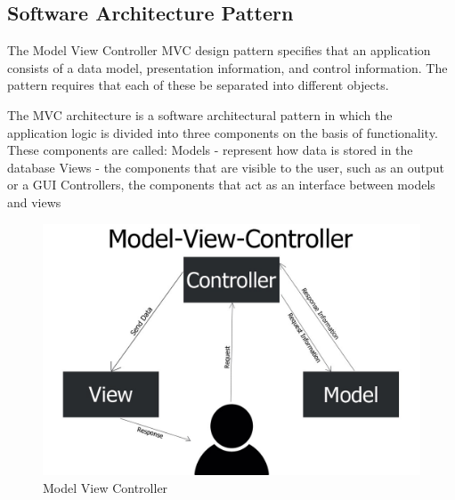 \subsection{Software Architecture Pattern}

The Model View Controller \ac{MVC} design pattern specifies that an application consists of a data model, presentation information, and control information. The pattern requires that each of these be separated into different objects.

The MVC architecture is a software architectural pattern in which the application logic is divided into three components on the basis of functionality. These components are called: Models - represent how data is stored in the database Views - the components that are visible to the user, such as an output or a GUI Controllers, the components that act as an interface between models and views


\begin{figure}[!ht]
      \center
      \includegraphics[scale=0.25]{assets/mvc.jpg}
      \caption{Model View Controller}
      \label{fig:mvc}
\end{figure}

